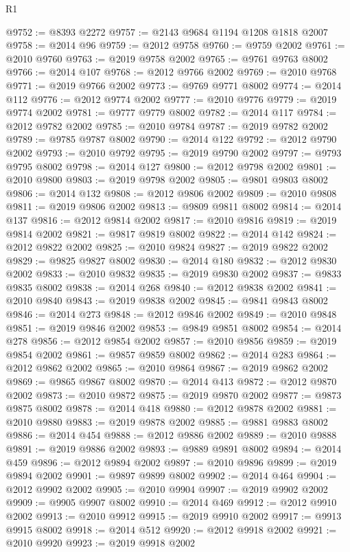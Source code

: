\begin{lexlean}{R1}
\begin{coremodule}
@9752 := @8393 @2272
@9757 := @2143 @9684 @1194 @1208 @1818 @2007
@9758 := @2014 @96
@9759 := @2012 @9758
@9760 := @9759 @2002
@9761 := @2010 @9760
@9763 := @2019 @9758 @2002
@9765 := @9761 @9763 @8002
@9766 := @2014 @107
@9768 := @2012 @9766 @2002
@9769 := @2010 @9768
@9771 := @2019 @9766 @2002
@9773 := @9769 @9771 @8002
@9774 := @2014 @112
@9776 := @2012 @9774 @2002
@9777 := @2010 @9776
@9779 := @2019 @9774 @2002
@9781 := @9777 @9779 @8002
@9782 := @2014 @117
@9784 := @2012 @9782 @2002
@9785 := @2010 @9784
@9787 := @2019 @9782 @2002
@9789 := @9785 @9787 @8002
@9790 := @2014 @122
@9792 := @2012 @9790 @2002
@9793 := @2010 @9792
@9795 := @2019 @9790 @2002
@9797 := @9793 @9795 @8002
@9798 := @2014 @127
@9800 := @2012 @9798 @2002
@9801 := @2010 @9800
@9803 := @2019 @9798 @2002
@9805 := @9801 @9803 @8002
@9806 := @2014 @132
@9808 := @2012 @9806 @2002
@9809 := @2010 @9808
@9811 := @2019 @9806 @2002
@9813 := @9809 @9811 @8002
@9814 := @2014 @137
@9816 := @2012 @9814 @2002
@9817 := @2010 @9816
@9819 := @2019 @9814 @2002
@9821 := @9817 @9819 @8002
@9822 := @2014 @142
@9824 := @2012 @9822 @2002
@9825 := @2010 @9824
@9827 := @2019 @9822 @2002
@9829 := @9825 @9827 @8002
@9830 := @2014 @180
@9832 := @2012 @9830 @2002
@9833 := @2010 @9832
@9835 := @2019 @9830 @2002
@9837 := @9833 @9835 @8002
@9838 := @2014 @268
@9840 := @2012 @9838 @2002
@9841 := @2010 @9840
@9843 := @2019 @9838 @2002
@9845 := @9841 @9843 @8002
@9846 := @2014 @273
@9848 := @2012 @9846 @2002
@9849 := @2010 @9848
@9851 := @2019 @9846 @2002
@9853 := @9849 @9851 @8002
@9854 := @2014 @278
@9856 := @2012 @9854 @2002
@9857 := @2010 @9856
@9859 := @2019 @9854 @2002
@9861 := @9857 @9859 @8002
@9862 := @2014 @283
@9864 := @2012 @9862 @2002
@9865 := @2010 @9864
@9867 := @2019 @9862 @2002
@9869 := @9865 @9867 @8002
@9870 := @2014 @413
@9872 := @2012 @9870 @2002
@9873 := @2010 @9872
@9875 := @2019 @9870 @2002
@9877 := @9873 @9875 @8002
@9878 := @2014 @418
@9880 := @2012 @9878 @2002
@9881 := @2010 @9880
@9883 := @2019 @9878 @2002
@9885 := @9881 @9883 @8002
@9886 := @2014 @454
@9888 := @2012 @9886 @2002
@9889 := @2010 @9888
@9891 := @2019 @9886 @2002
@9893 := @9889 @9891 @8002
@9894 := @2014 @459
@9896 := @2012 @9894 @2002
@9897 := @2010 @9896
@9899 := @2019 @9894 @2002
@9901 := @9897 @9899 @8002
@9902 := @2014 @464
@9904 := @2012 @9902 @2002
@9905 := @2010 @9904
@9907 := @2019 @9902 @2002
@9909 := @9905 @9907 @8002
@9910 := @2014 @469
@9912 := @2012 @9910 @2002
@9913 := @2010 @9912
@9915 := @2019 @9910 @2002
@9917 := @9913 @9915 @8002
@9918 := @2014 @512
@9920 := @2012 @9918 @2002
@9921 := @2010 @9920
@9923 := @2019 @9918 @2002

\end{coremodule}
\end{lexlean}
